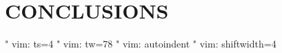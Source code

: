 \section{CONCLUSIONS}
\cite{1}
 




\clearpage
\appendix



" vim: ts=4
" vim: tw=78
" vim: autoindent
" vim: shiftwidth=4
